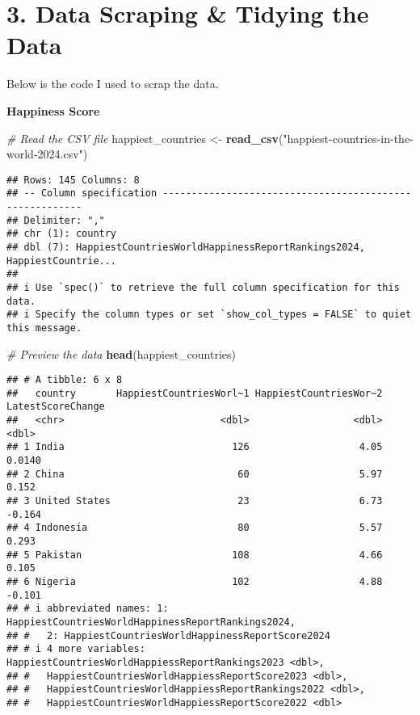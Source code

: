 \documentclass[
]{article}
\newenvironment{Shaded}{\begin{snugshade}}{\end{snugshade}}
\newcommand{\CommentTok}[1]{\textcolor[rgb]{0.56,0.35,0.01}{\textit{#1}}}
\newcommand{\FunctionTok}[1]{\textcolor[rgb]{0.13,0.29,0.53}{\textbf{#1}}}
\newcommand{\NormalTok}[1]{#1}
\newcommand{\OtherTok}[1]{\textcolor[rgb]{0.56,0.35,0.01}{#1}}
\newcommand{\StringTok}[1]{\textcolor[rgb]{0.31,0.60,0.02}{#1}}
\begin{document}
\section{3. Data Scraping \& Tidying the
Data}\label{data-scraping-tidying-the-data}

Below is the code I used to scrap the data.

\textbf{Happiness Score}

\begin{Shaded}
\begin{Highlighting}[]
\CommentTok{\# Read the CSV file}
\NormalTok{happiest\_countries }\OtherTok{\textless{}{-}} \FunctionTok{read\_csv}\NormalTok{(}\StringTok{"happiest{-}countries{-}in{-}the{-}world{-}2024.csv"}\NormalTok{)}
\end{Highlighting}
\end{Shaded}

\begin{verbatim}
## Rows: 145 Columns: 8
## -- Column specification --------------------------------------------------------
## Delimiter: ","
## chr (1): country
## dbl (7): HappiestCountriesWorldHappinessReportRankings2024, HappiestCountrie...
## 
## i Use `spec()` to retrieve the full column specification for this data.
## i Specify the column types or set `show_col_types = FALSE` to quiet this message.
\end{verbatim}

\begin{Shaded}
\begin{Highlighting}[]
\CommentTok{\# Preview the data}
\FunctionTok{head}\NormalTok{(happiest\_countries)}
\end{Highlighting}
\end{Shaded}

\begin{verbatim}
## # A tibble: 6 x 8
##   country       HappiestCountriesWorl~1 HappiestCountriesWor~2 LatestScoreChange
##   <chr>                           <dbl>                  <dbl>             <dbl>
## 1 India                             126                   4.05            0.0140
## 2 China                              60                   5.97            0.152 
## 3 United States                      23                   6.73           -0.164 
## 4 Indonesia                          80                   5.57            0.293 
## 5 Pakistan                          108                   4.66            0.105 
## 6 Nigeria                           102                   4.88           -0.101 
## # i abbreviated names: 1: HappiestCountriesWorldHappinessReportRankings2024,
## #   2: HappiestCountriesWorldHappinessReportScore2024
## # i 4 more variables: HappiestCountriesWorldHappiessReportRankings2023 <dbl>,
## #   HappiestCountriesWorldHappiessReportScore2023 <dbl>,
## #   HappiestCountriesWorldHappiessReportRankings2022 <dbl>,
## #   HappiestCountriesWorldHappiessReportScore2022 <dbl>
\end{verbatim}
\end{document}
